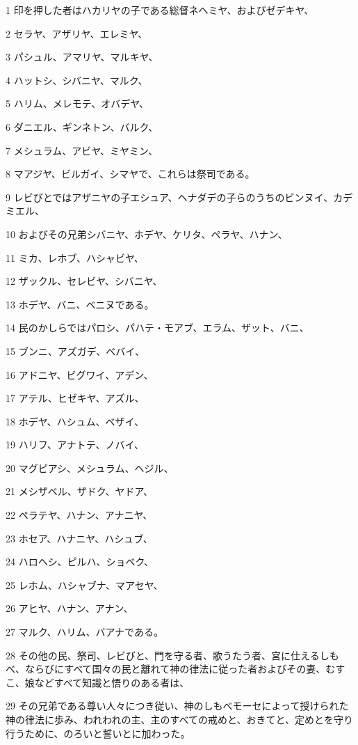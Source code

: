 \par 1 印を押した者はハカリヤの子である総督ネヘミヤ、およびゼデキヤ、
\par 2 セラヤ、アザリヤ、エレミヤ、
\par 3 パシュル、アマリヤ、マルキヤ、
\par 4 ハットシ、シバニヤ、マルク、
\par 5 ハリム、メレモテ、オバデヤ、
\par 6 ダニエル、ギンネトン、バルク、
\par 7 メシュラム、アビヤ、ミヤミン、
\par 8 マアジヤ、ビルガイ、シマヤで、これらは祭司である。
\par 9 レビびとではアザニヤの子エシュア、ヘナダデの子らのうちのビンヌイ、カデミエル、
\par 10 およびその兄弟シバニヤ、ホデヤ、ケリタ、ペラヤ、ハナン、
\par 11 ミカ、レホブ、ハシャビヤ、
\par 12 ザックル、セレビヤ、シバニヤ、
\par 13 ホデヤ、バニ、ベニヌである。
\par 14 民のかしらではパロシ、パハテ・モアブ、エラム、ザット、バニ、
\par 15 ブンニ、アズガデ、ベバイ、
\par 16 アドニヤ、ビグワイ、アデン、
\par 17 アテル、ヒゼキヤ、アズル、
\par 18 ホデヤ、ハシュム、ベザイ、
\par 19 ハリフ、アナトテ、ノバイ、
\par 20 マグピアシ、メシュラム、ヘジル、
\par 21 メシザベル、ザドク、ヤドア、
\par 22 ペラテヤ、ハナン、アナニヤ、
\par 23 ホセア、ハナニヤ、ハシュブ、
\par 24 ハロヘシ、ピルハ、ショベク、
\par 25 レホム、ハシャブナ、マアセヤ、
\par 26 アヒヤ、ハナン、アナン、
\par 27 マルク、ハリム、バアナである。
\par 28 その他の民、祭司、レビびと、門を守る者、歌うたう者、宮に仕えるしもべ、ならびにすべて国々の民と離れて神の律法に従った者およびその妻、むすこ、娘などすべて知識と悟りのある者は、
\par 29 その兄弟である尊い人々につき従い、神のしもべモーセによって授けられた神の律法に歩み、われわれの主、主のすべての戒めと、おきてと、定めとを守り行うために、のろいと誓いとに加わった。
